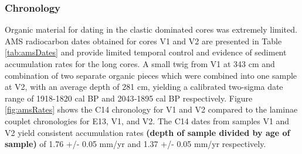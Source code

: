 \documentclass[Royal,times,doublespace,sageh]{sagej}
\begin{document}
\hypertarget{chronology}{%
\subsubsection{Chronology}\label{chronology}}

Organic material for dating in the clastic dominated cores was extremely
limited. AMS radiocarbon dates obtained for cores V1 and V2 are
presented in Table \ref{tab:amsDates} and provide limited temporal
control and evidence of sediment accumulation rates for the long cores.
A small twig from V1 at 343 cm and combination of two separate organic
pieces which were combined into one sample at V2, with an average depth
of 281 cm, yielding a calibrated \citep{Reimer2013} two-sigma date range
of 1918-1820 cal BP and 2043‐1895 cal BP respectively. Figure
\ref{fig:amsRates} shows the C14 chronology for V1 and V2 compared to
the laminae couplet chronologies for E13, V1, and V2. The C14 dates from
samples V1 and V2 yield consistent accumulation rates \textbf{(depth of
sample divided by age of sample)} of 1.76 +/- 0.05 mm/yr and 1.37 +/-
0.05 mm/yr respectively.
\end{document}
